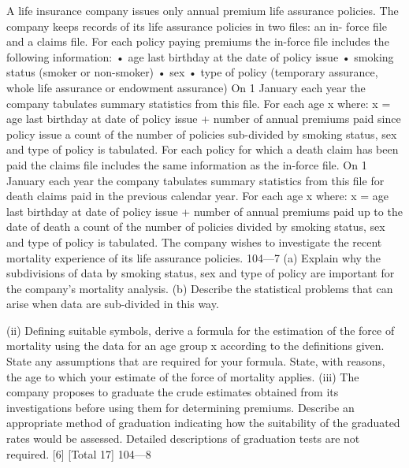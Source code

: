 \documentclass[a4paper,12pt]{article}
\begin{document}
A life insurance company issues only annual premium life assurance policies.
The company keeps records of its life assurance policies in two files: an in-
force file and a claims file.
For each policy paying premiums the in-force file includes the following
information:
• age last birthday at the date of policy issue
• smoking status (smoker or non-smoker)
• sex
• type of policy (temporary assurance, whole life assurance or endowment
assurance)
On 1 January each year the company tabulates summary statistics from this
file. For each age x where:
x = age last birthday at date of policy issue
+ number of annual premiums paid since policy issue
a count of the number of policies sub-divided by smoking status, sex and type
of policy is tabulated.
For each policy for which a death claim has been paid the claims file includes
the same information as the in-force file.
On 1 January each year the company tabulates summary statistics from this
file for death claims paid in the previous calendar year. For each age x where:
x = age last birthday at date of policy issue
+ number of annual premiums paid up to the date of death
a count of the number of policies divided by smoking status, sex and type of
policy is tabulated.
The company wishes to investigate the recent mortality experience of its life
assurance policies.
104—7
(a) Explain why the subdivisions of data by smoking status, sex and
type of policy are important for the company’s mortality analysis.
(b) Describe the statistical problems that can arise when data are
sub-divided in this way.

(ii) Defining suitable symbols, derive a formula for the estimation of the
force of mortality using the data for an age group x according to the
definitions given. State any assumptions that are required for your
formula. State, with reasons, the age to which your estimate of the
force of mortality applies.
(iii) The company proposes to graduate the crude estimates obtained from
its investigations before using them for determining premiums.
Describe an appropriate method of graduation indicating how the
suitability of the graduated rates would be assessed. Detailed
descriptions of graduation tests are not required.
[6]
[Total 17]
104—8


\end{document}
